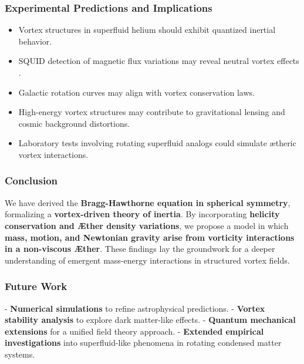 \subsubsection*{Experimental Predictions and Implications}
\begin{itemize}
    \item Vortex structures in superfluid helium should exhibit quantized inertial behavior.
    \item SQUID detection of magnetic flux variations may reveal neutral vortex effects \cite{donnelly1991quantized}.
    \item Galactic rotation curves may align with vortex conservation laws.
    \item High-energy vortex structures may contribute to gravitational lensing and cosmic background distortions.
    \item Laboratory tests involving rotating superfluid analogs could simulate ætheric vortex interactions.
\end{itemize}

\subsubsection*{Conclusion}
We have derived the \textbf{Bragg-Hawthorne equation in spherical symmetry}, formalizing a \textbf{vortex-driven theory of inertia}. By incorporating \textbf{helicity conservation and Æther density variations}, we propose a model in which \textbf{mass, motion, and Newtonian gravity arise from vorticity interactions in a non-viscous Æther}. These findings lay the groundwork for a deeper understanding of emergent mass-energy interactions in structured vortex fields.

\subsubsection*{Future Work}
- \textbf{Numerical simulations} to refine astrophysical predictions.
- \textbf{Vortex stability analysis} to explore dark matter-like effects.
- \textbf{Quantum mechanical extensions} for a unified field theory approach.
- \textbf{Extended empirical investigations} into superfluid-like phenomena in rotating condensed matter systems.